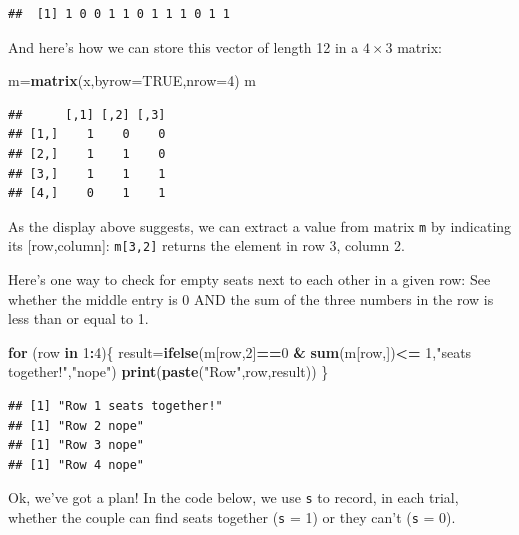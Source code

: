 \documentclass[
]{book}
\newenvironment{Shaded}{\begin{snugshade}}{\end{snugshade}}
\newcommand{\AttributeTok}[1]{\textcolor[rgb]{0.13,0.29,0.53}{#1}}
\newcommand{\ConstantTok}[1]{\textcolor[rgb]{0.56,0.35,0.01}{#1}}
\newcommand{\ControlFlowTok}[1]{\textcolor[rgb]{0.13,0.29,0.53}{\textbf{#1}}}
\newcommand{\DecValTok}[1]{\textcolor[rgb]{0.00,0.00,0.81}{#1}}
\newcommand{\FunctionTok}[1]{\textcolor[rgb]{0.13,0.29,0.53}{\textbf{#1}}}
\newcommand{\NormalTok}[1]{#1}
\newcommand{\OtherTok}[1]{\textcolor[rgb]{0.56,0.35,0.01}{#1}}
\newcommand{\SpecialCharTok}[1]{\textcolor[rgb]{0.81,0.36,0.00}{\textbf{#1}}}
\newcommand{\StringTok}[1]{\textcolor[rgb]{0.31,0.60,0.02}{#1}}
\theoremstyle{definition}
\theoremstyle{definition}
\theoremstyle{definition}
\theoremstyle{definition}
\theoremstyle{remark}
\begin{document}
\begin{verbatim}
##  [1] 1 0 0 1 1 0 1 1 1 0 1 1
\end{verbatim}

And here's how we can store this vector of length 12 in a \(4\times 3\) matrix:

\begin{Shaded}
\begin{Highlighting}[]
\NormalTok{m}\OtherTok{=}\FunctionTok{matrix}\NormalTok{(x,}\AttributeTok{byrow=}\ConstantTok{TRUE}\NormalTok{,}\AttributeTok{nrow=}\DecValTok{4}\NormalTok{)}
\NormalTok{m}
\end{Highlighting}
\end{Shaded}

\begin{verbatim}
##      [,1] [,2] [,3]
## [1,]    1    0    0
## [2,]    1    1    0
## [3,]    1    1    1
## [4,]    0    1    1
\end{verbatim}

As the display above suggests, we can extract a value from matrix \texttt{m} by indicating its {[}row,column{]}: \texttt{m{[}3,2{]}} returns the element in row 3, column 2.

Here's one way to check for empty seats next to each other in a given row: See whether the middle entry is 0 AND the sum of the three numbers in the row is less than or equal to 1.

\begin{Shaded}
\begin{Highlighting}[]
\ControlFlowTok{for}\NormalTok{ (row }\ControlFlowTok{in} \DecValTok{1}\SpecialCharTok{:}\DecValTok{4}\NormalTok{)\{}
\NormalTok{  result}\OtherTok{=}\FunctionTok{ifelse}\NormalTok{(m[row,}\DecValTok{2}\NormalTok{]}\SpecialCharTok{==}\DecValTok{0} \SpecialCharTok{\&} \FunctionTok{sum}\NormalTok{(m[row,])}\SpecialCharTok{\textless{}=} \DecValTok{1}\NormalTok{,}\StringTok{"seats together!"}\NormalTok{,}\StringTok{"nope"}\NormalTok{)}
   \FunctionTok{print}\NormalTok{(}\FunctionTok{paste}\NormalTok{(}\StringTok{"Row"}\NormalTok{,row,result))}
\NormalTok{\}}
\end{Highlighting}
\end{Shaded}

\begin{verbatim}
## [1] "Row 1 seats together!"
## [1] "Row 2 nope"
## [1] "Row 3 nope"
## [1] "Row 4 nope"
\end{verbatim}

Ok, we've got a plan! In the code below, we use \texttt{s} to record, in each trial, whether the couple can find seats together (\texttt{s} = 1) or they can't (\texttt{s} = 0).
\end{document}
